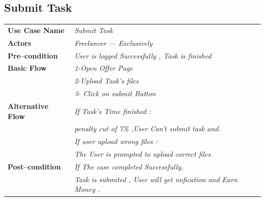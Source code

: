 \documentclass{article}
\begin{document}
				\subsection{ 	Submit Task }
    \begin{tabular}{ l | l }
    \toprule
      \rowcolor{LightCyan}
      \textbf{Use Case Name}    & \textit{  Submit Task }\\
      \textbf{Actors}           & \textit{ Freelancer --- Exclusively}\\
      \rowcolor{LightCyan}
      \textbf{Pre--condition}   & \textit {User is logged Successfully , Task is finished   } \\
      \rowcolor{LightCyan}
      \textbf{Basic Flow}       & \textit{ 1-Open Offer  Page }\\
                                & \textit{ 2-Upload Task's files}\\
								& \textit{3- Click on submit  Button }\\
								
								
	  \rowcolor{LightCyan}
      \textbf{	Alternative Flow}     
								& \textit{		If Task's Time finished : }\\
		
								& \textit{penalty cut of 7\% ,User Can't submit task and.  }\\
							
								& \textit{ 	If user upload wrong files  :}\\
		
							   & \textit{	The User is prompted to upload correct files  	 }\\		

									
 
								
      \rowcolor{LightCyan}
      \textbf{Post--condition}  & \textit{ 		If The case completed Successfully,}\\ &\textit{ Task is submited  , User will get nofication and Earn Money .}\\
    \toprule
    \end{tabular}
	
	
	
\end{document}
